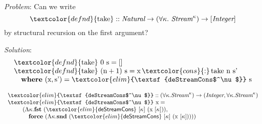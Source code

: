 \documentclass[xetex,serif,mathserif]{beamer}
\newenvironment{slide}[1]{\begin{frame}\frametitle{#1}}{\end{frame}}
\newcommand{\cons}[1]{\textcolor{cons}{\textsf{#1}}}
\newcommand{\elim}[1]{\textcolor{elim}{\textsf{#1}}}
\newcommand{\kw}[1]{\textbf{#1}}
\newcommand{\tyname}[1]{\textit{#1}}
\newcommand{\ident}[1]{\textrm{#1}}
\newcommand{\defn}[1]{\textcolor{defnd}{\textrm{#1}}}
\begin{document}
\begin{slide}{}
  \textcolor{titlered}{\emph{Problem}}:
  Can we write
  \begin{displaymath}
    \defn{take} :: \tyname{Natural} \to (\forall \kappa.\ \tyname{Stream}^\kappa) \to [\tyname{Integer}]
  \end{displaymath}
  by structural recursion on the first argument?

  \bigskip

  \pause
  \textcolor{titlered}{\emph{Solution}}:
  \begin{displaymath}
    \begin{array}{l}
      \defn{take}\ 0\ \ident{s} = [] \\
      \defn{take}\ (\ident{n}+1)\ \ident{s} = \ident{x} \mathop{\cons{:}} \ident{take}\ \ident{n}\ \ident{s’} \\
      \quad \kw{where}\ (\ident{x}, \ident{s’}) = \elim{deStreamCons$^\nu$}\ \ident{s}
    \end{array}
  \end{displaymath}

  \pause
  \begin{displaymath}
    \begin{array}{l}
      \elim{deStreamCons$^\nu$} :: (\forall \kappa. \tyname{Stream}^\kappa) \to (\tyname{Integer}, \forall \kappa. \tyname{Stream}^\kappa) \\
      \elim{deStreamCons$^\nu$}\ \ident{x} = \\
      \quad\quad
      \begin{array}[t]{l}
        (\Lambda \kappa. \kw{fst}\ (\elim{deStreamCons}\ [\kappa]\ (\ident{x}\ [\kappa])),\\
        \quad\kw{force}\ (\Lambda \kappa. \kw{snd}\ (\elim{deStreamCons}\ [\kappa]\ (\ident{x}\ [\kappa]))))
      \end{array}
    \end{array}
  \end{displaymath}
\end{slide}

\frame{}

    
\end{document}
